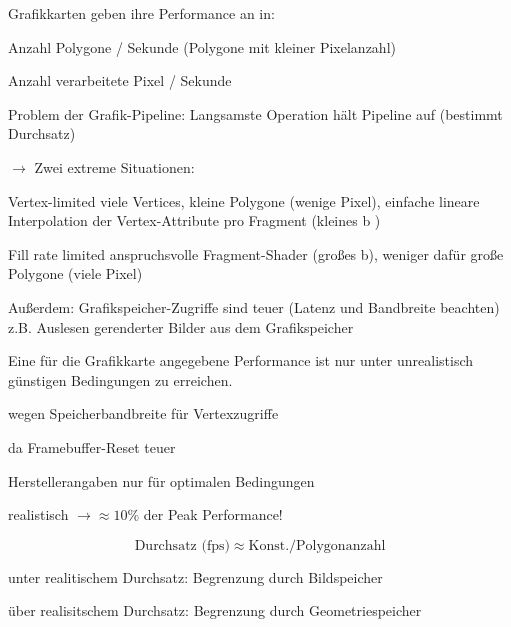 \documentclass[landscape]{article}
\makeatletter
\renewcommand{\subsection}{\@startsection{subsection}{2}{0mm}%
                                {-1explus -.5ex minus -.2ex}%
                                {0.5ex plus .2ex}%
                                {\normalfont\normalsize\bfseries}}
\makeatother
\begin{document}
\begin{multicols}{3}
  \begin{itemize*}
    \item Grafikkarten geben ihre Performance an in:
    \begin{itemize*}
      \item Anzahl Polygone / Sekunde (Polygone mit kleiner Pixelanzahl)
      \item Anzahl verarbeitete Pixel / Sekunde
    \end{itemize*}
    \item Problem der Grafik-Pipeline: Langsamste Operation hält Pipeline auf (bestimmt Durchsatz) 
    \item $\rightarrow$ Zwei extreme Situationen:
    \begin{description*}
      \item[Vertex-limited] viele Vertices, kleine Polygone (wenige Pixel), einfache lineare Interpolation der Vertex-Attribute pro Fragment (kleines b )
      \item[Fill rate limited] anspruchsvolle Fragment-Shader (großes b), weniger dafür große Polygone (viele Pixel)
    \end{description*}
    \item Außerdem: Grafikspeicher-Zugriffe sind teuer (Latenz und Bandbreite beachten) z.B. Auslesen gerenderter Bilder aus dem Grafikspeicher
    \item Eine für die Grafikkarte angegebene Performance ist nur unter unrealistisch günstigen Bedingungen zu erreichen.
    \begin{itemize*}
      \item  wegen Speicherbandbreite für Vertexzugriffe
      \item  da Framebuffer-Reset teuer
      \item  Herstellerangaben nur für optimalen Bedingungen
      \item  realistisch $\rightarrow\approx 10\%$ der Peak Performance!
    \end{itemize*}
  \end{itemize*}
  
  $$\text{Durchsatz (fps)} \approx \text{Konst.} / \text{Polygonanzahl}$$
  \begin{itemize*}
    \item unter realitischem Durchsatz: Begrenzung durch Bildspeicher
    \item über realisitschem Durchsatz: Begrenzung durch Geometriespeicher
  \end{itemize*}
  
  
\end{multicols}
\end{document}
